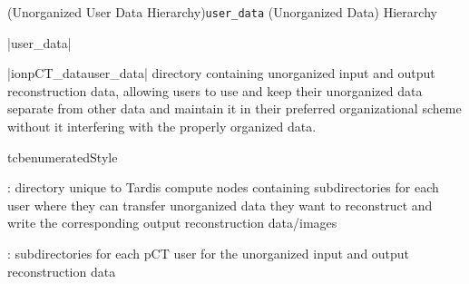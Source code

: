 \Subsection(Unorganized User Data Hierarchy){\texttt{user\_data} (Unorganized Data) Hierarchy}
\begin{tcbenvironment}|user\_data|
\begin{tcbparbox}|\dirsep ion\dirsep pCT\_data\dirsep user\_data|%
\bfdash directory containing unorganized input and output reconstruction data, allowing users to use and keep their
unorganized data separate from other data and maintain it in their preferred organizational scheme without it
interfering with the properly organized data.
\end{tcbparbox}
\begin{tcbparbox}{tcbenumeratedStyle}
\begin{ThinEnum}[labelindent=1pt, leftmargin=*]
    \item {} : directory unique to Tardis compute nodes containing subdirectories for each
        user where they can transfer unorganized data they want to reconstruct and write the corresponding output
        reconstruction data/images
    \begin{ThinEnum}[labelindent=1pt, leftmargin=*]
        \item {} : subdirectories for each pCT user for the unorganized input
            and output reconstruction data
    \end{ThinEnum}
\end{ThinEnum}
\end{tcbparbox}
\end{tcbenvironment}
\endinput
